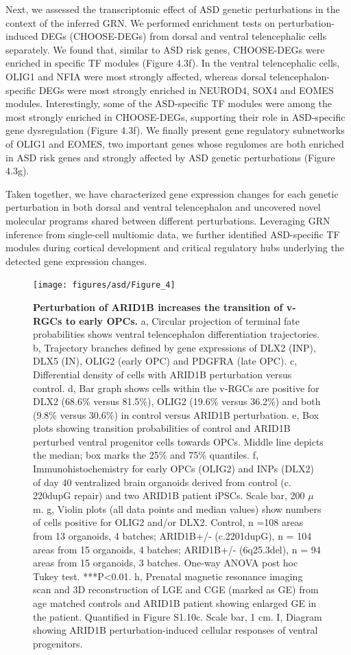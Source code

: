 Next, we assessed the transcriptomic effect of ASD genetic perturbations in the context of the inferred GRN. We performed enrichment tests on perturbation-induced DEGs (CHOOSE-DEGs) from dorsal and ventral telencephalic cells separately. We found that, similar to ASD risk genes, CHOOSE-DEGs were enriched in specific TF modules (Figure 4.3f). In the ventral telencephalic cells, OLIG1 and NFIA were most strongly affected, whereas dorsal telencephalon-specific DEGs were most strongly enriched in NEUROD4, SOX4 and EOMES modules. Interestingly, some of the ASD-specific TF modules were among the most strongly enriched in CHOOSE-DEGs, supporting their role in ASD-specific gene dysregulation (Figure 4.3f). We finally present gene regulatory subnetworks of OLIG1 and EOMES, two important genes whose regulomes are both enriched in ASD risk genes and strongly affected by ASD genetic perturbations (Figure 4.3g). 

Taken together, we have characterized gene expression changes for each genetic perturbation in both dorsal and ventral telencephalon and uncovered novel molecular programs shared between different perturbations. Leveraging GRN inference from single-cell multiomic data, we further identified ASD-specific TF modules during cortical development and critical regulatory hubs underlying the detected gene expression changes.

\begin{figure}[b!]
    \centering
	\texttt{[image: figures/asd/Figure\_4]}
    \caption{\textbf{Perturbation of ARID1B increases the transition of v-RGCs to early OPCs.}
    a, Circular projection of terminal fate probabilities shows ventral telencephalon differentiation trajectories. b, Trajectory branches defined by gene expressions of DLX2 (INP), DLX5 (IN), OLIG2 (early OPC) and PDGFRA (late OPC). c, Differential density of cells with ARID1B perturbation versus control. d, Bar graph shows cells within the v-RGCs are positive for DLX2 (68.6\% versus 81.5\%), OLIG2 (19.6\% versus 36.2\%) and both (9.8\% versus 30.6\%) in control versus ARID1B perturbation. e, Box plots showing transition probabilities of control and ARID1B perturbed ventral progenitor cells towards OPCs. Middle line depicts the median; box marks the 25\% and 75\% quantiles. f, Immunohistochemistry for early OPCs (OLIG2) and INPs (DLX2) of day 40 ventralized brain organoids derived from control (c. 220dupG repair) and two ARID1B patient iPSCs. Scale bar, 200 $\mu$m. g, Violin plots (all data points and median values) show numbers of cells positive for OLIG2 and/or DLX2. Control, n =108 areas from 13 organoids, 4 batches; ARID1B+/- (c.2201dupG), n = 104 areas from 15 organoids, 4 batches; ARID1B+/- (6q25.3del), n = 94 areas from 15 organoids, 3 batches. One-way ANOVA post hoc Tukey test. ***P<0.01. h, Prenatal magnetic resonance imaging scan and 3D reconstruction of LGE and CGE (marked as GE) from age matched controls and ARID1B patient showing enlarged GE in the patient. Quantified in Figure S1.10c. Scale bar, 1 cm. I, Diagram showing ARID1B perturbation-induced cellular responses of ventral progenitors.}
    \label{fig:asd4}
\end{figure}

